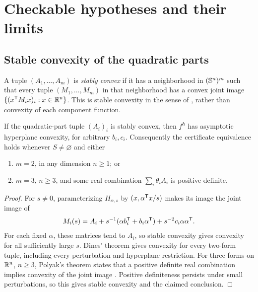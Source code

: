 \section{Checkable hypotheses and their limits}
\label{sec:hypotheses}

\subsection{Stable convexity of the quadratic parts}

A tuple $(A_1,\ldots,A_m)$ is \emph{stably convex} if it has a
neighborhood in $(\mathbb S^n)^m$ such that every tuple $(M_1,\ldots,M_m)$
in that neighborhood has a convex joint image
$\{(x^{\mathsf T} M_i x)_i:x\in\mathbb R^n\}$. This is stable convexity in
the sense of \citet{Sheriff2013}, rather than convexity of each
component function.

\begin{proposition}\label{prop:stable}
If the quadratic-part tuple $(A_i)_i$ is stably convex, then $f^h$
has asymptotic hyperplane convexity, for arbitrary $b_i,c_i$.
Consequently the certificate equivalence holds whenever $S\ne\varnothing$
and either
\begin{enumerate}
\item $m=2$, in any dimension $n\geq1$; or
\item $m=3$, $n\geq3$, and some real combination
      $\sum_i\theta_i A_i$ is positive definite.
\end{enumerate}
\end{proposition}
\begin{proof}
For $s\ne0$, parameterizing $H_{\alpha,s}$ by
$(x,\alpha^{\mathsf T} x/s)$ makes its image the joint image of
\begin{equation}\label{eq:perturbed-parts}
 M_i(s)=A_i+s^{-1}(\alpha b_i^{\mathsf T}+b_i\alpha^{\mathsf T})
                         +s^{-2}c_i\alpha\alpha^{\mathsf T}.
\end{equation}
For each fixed $\alpha$, these matrices tend to $A_i$, so stable
convexity gives convexity for all sufficiently large $s$.
Dines' theorem gives convexity for every two-form tuple, including
every perturbation and hyperplane restriction.
For three forms on $\mathbb R^n$, $n\geq3$, Polyak's theorem states that
a positive definite real combination implies convexity of the joint
image \citep[Theorem~2.1]{Polyak1998}. Positive definiteness persists
under small perturbations, so this gives stable convexity and the
claimed conclusion.
\end{proof}

